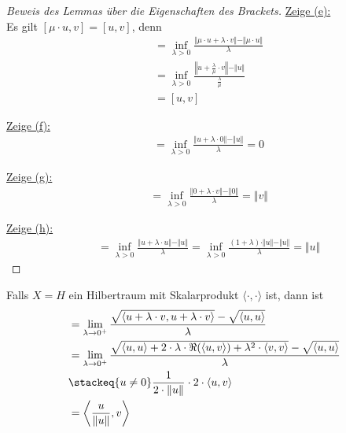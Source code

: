 \begin{proof}[Beweis des Lemmas über die Eigenschaften des Brackets]
\underline{Zeige (e):}\\
Es gilt $[\mu\cdot u,v]=[u,v]$, denn
\begin{align*}
[\mu\cdot u,v]
&=
\inf\limits_{\lambda>0}\frac{\Vert\mu\cdot u+\lambda\cdot v\Vert-\Vert\mu\cdot u\Vert}{\lambda}\\
&=\inf\limits_{\lambda>0}\frac{\left\Vert u+\frac{\lambda}{\mu}\cdot v\right\Vert-\Vert u\Vert}{\frac{\lambda}{\mu}}\\
&=
[u,v]
\end{align*}

\underline{Zeige (f):}
\begin{align*}
[u,0]
&=
\inf\limits_{\lambda>0}\frac{\Vert u+\lambda\cdot0\Vert-\Vert u\Vert}{\lambda}
=0
\end{align*}

\underline{Zeige (g):}
\begin{align*}
[0,v]
&=
\inf\limits_{\lambda>0}\frac{\Vert 0+\lambda\cdot v\Vert-\Vert 0\Vert}{\lambda}
=\Vert v\Vert
\end{align*}

\underline{Zeige (h):}
\begin{align*}
[u,u]
&=
\inf\limits_{\lambda>0}\frac{\Vert u+\lambda\cdot u\Vert-\Vert u\Vert}{\lambda}
=
\inf\limits_{\lambda>0}\frac{(1+\lambda)\cdot\Vert u\Vert-\Vert u\Vert}{\lambda}
=\Vert u\Vert
\end{align*}
\end{proof}

\begin{bemerkung}
Falls $X=H$ ein Hilbertraum mit Skalarprodukt $\langle\cdot,\cdot\rangle$ ist, dann ist
\begin{align*}
[u,v] 
&=
\lim\limits_{\lambda\to0^+}\frac{\sqrt{\langle u+\lambda\cdot v,u+\lambda\cdot v\rangle}-\sqrt{\langle u,u\rangle}}{\lambda}\\
&=\lim\limits_{\lambda\to0^+}\frac{\sqrt{\langle u,u\rangle+2\cdot\lambda\cdot\Re(\langle u,v\rangle)+\lambda^2\cdot\langle v,v\rangle}-\sqrt{\langle u,u\rangle}}{\lambda}\\
&\stackeq{u\neq0}
\frac{1}{2\cdot\Vert u\Vert}\cdot 2\cdot\langle u,v\rangle\\
&=\left\langle\frac{u}{\Vert u\Vert},v\right\rangle
\end{align*}
\end{bemerkung}

